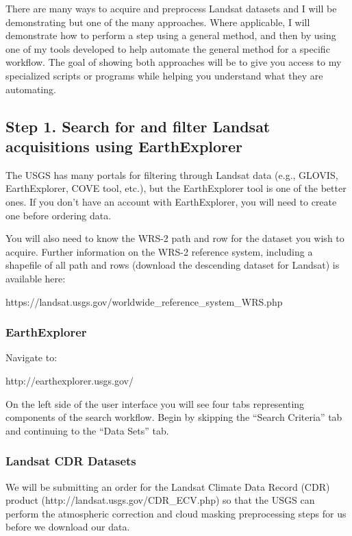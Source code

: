 \documentclass{article}
\begin{document}
There are many ways to acquire and preprocess Landsat datasets and I
will be demonstrating but one of the many approaches. Where applicable,
I will demonstrate how to perform a step using a general method, and
then by using one of my tools developed to help automate the general
method for a specific workflow. The goal of showing both approaches will
be to give you access to my specialized scripts or programs while
helping you understand what they are automating.

    \subsection{Step 1. Search for and filter Landsat acquisitions using
EarthExplorer}\label{step-1.-search-for-and-filter-landsat-acquisitions-using-earthexplorer}

The USGS has many portals for filtering through Landsat data (e.g.,
GLOVIS, EarthExplorer, COVE tool, etc.), but the EarthExplorer tool is
one of the better ones. If you don't have an account with EarthExplorer,
you will need to create one before ordering data.

You will also need to know the WRS-2 path and row for the dataset you
wish to acquire. Further information on the WRS-2 reference system,
including a shapefile of all path and rows (download the descending
dataset for Landsat) is available here:

https://landsat.usgs.gov/worldwide\_reference\_system\_WRS.php

\subsubsection{EarthExplorer}\label{earthexplorer}

Navigate to:

http://earthexplorer.usgs.gov/

On the left side of the user interface you will see four tabs
representing components of the search workflow. Begin by skipping the
``Search Criteria'' tab and continuing to the ``Data Sets'' tab.

\subsubsection{Landsat CDR Datasets}\label{landsat-cdr-datasets}

We will be submitting an order for the Landsat Climate Data Record (CDR)
product (http://landsat.usgs.gov/CDR\_ECV.php) so that the USGS can
perform the atmospheric correction and cloud masking preprocessing steps
for us before we download our data.
\end{document}
